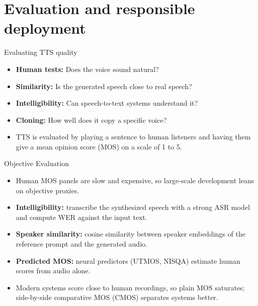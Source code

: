 \section{Evaluation and responsible deployment}

\begin{frame}{Evaluating TTS quality}
  \begin{itemize}
    \item \textbf{Human tests:} Does the voice sound natural?
    \item \textbf{Similarity:} Is the generated speech close to real speech?
    \item \textbf{Intelligibility:} Can speech-to-text systems understand it?
    \item \textbf{Cloning:} How well does it copy a specific voice?
    \item TTS is evaluated by playing a sentence to human listeners and having them
give a mean opinion score (MOS) on a scale of 1 to 5.
  \end{itemize}
\end{frame}

\begin{frame}{Objective Evaluation}
  \begin{itemize}\itemsep0.4em
    \item Human MOS panels are slow and expensive, so large-scale development leans on objective proxies.
    \item \textbf{Intelligibility:} transcribe the synthesized speech with a strong ASR model and compute WER against the input text.
    \item \textbf{Speaker similarity:} cosine similarity between speaker embeddings of the reference prompt and the generated audio.
    \item \textbf{Predicted MOS:} neural predictors (UTMOS, NISQA) estimate human scores from audio alone.
    \item Modern systems score close to human recordings, so plain MOS saturates; side-by-side comparative MOS (CMOS) separates systems better.
  \end{itemize}
\end{frame}

